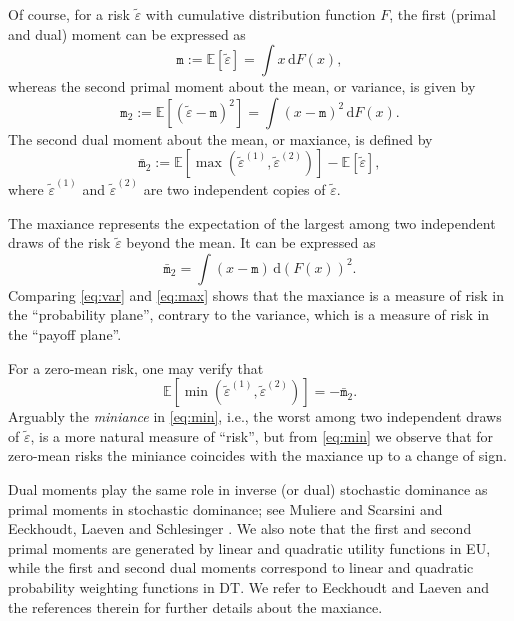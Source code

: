 \documentclass[11pt]{article}
\begin{document}
Of course, for a risk $\tilde{\varepsilon}$ with cumulative distribution function $F$,
the first (primal and dual) moment can be expressed as
\begin{equation}
\texttt{m}:=\mathbb{E}\left[\tilde{\varepsilon}\right]=\int x\,\mathrm{d}F(x),
\end{equation}
whereas the second primal moment about the mean, or variance, is given by
\begin{equation}
\texttt{m}_{2}:=\mathbb{E}\left[\left(\tilde{\varepsilon}-\texttt{m}\right)^{2}\right]=\int \left(x-\texttt{m}\right)^{2}\,\mathrm{d}F(x).
\label{eq:var}
\end{equation}
The second dual moment about the mean, or maxiance, is defined by
\begin{equation}
\bar{\texttt{m}}_{2}:=\mathbb{E}\left[\max\left(\tilde{\varepsilon}^{(1)},\tilde{\varepsilon}^{(2)}\right)\right]-\mathbb{E}\left[\tilde{\varepsilon}\right],
\end{equation}
where $\tilde{\varepsilon}^{(1)}$ and $\tilde{\varepsilon}^{(2)}$
are two independent copies of $\tilde{\varepsilon}$.

The maxiance represents the expectation of the largest
among two independent draws of the risk $\tilde{\varepsilon}$
beyond the mean.
It can be expressed as
\begin{equation}
\bar{\texttt{m}}_{2}=\int \left(x-\texttt{m}\right)\,\mathrm{d}\left(F(x)\right)^{2}.
\label{eq:max}
\end{equation}
Comparing \eqref{eq:var} and \eqref{eq:max} shows that the maxiance is a measure of risk in the ``probability plane'',
contrary to the variance, which is a measure of risk in the ``payoff plane''.

For a zero-mean risk, one may verify that
\begin{equation}
\mathbb{E}\left[\min\left(\tilde{\varepsilon}^{(1)},\tilde{\varepsilon}^{(2)}\right)\right]=-\bar{\texttt{m}}_{2}.
\label{eq:min}
\end{equation}
Arguably the \textit{miniance} in \eqref{eq:min},
i.e., the worst among two independent draws of $\tilde{\varepsilon}$,
is a more natural measure of ``risk'',
but from \eqref{eq:min} we observe that for zero-mean risks
the miniance coincides with the maxiance up to a change of sign.

Dual moments play the same role in inverse (or dual) stochastic dominance as primal moments in stochastic dominance;
see Muliere and Scarsini \cite{MS89} and Eeckhoudt, Laeven and Schlesinger \cite{ELS20}.
We also note that the first and second primal moments are generated by linear and quadratic utility functions in EU,
while the first and second dual moments correspond to linear and quadratic probability weighting functions in DT.
We refer to Eeckhoudt and Laeven \cite{EL20} and the references therein for further details about the maxiance.
\end{document}
